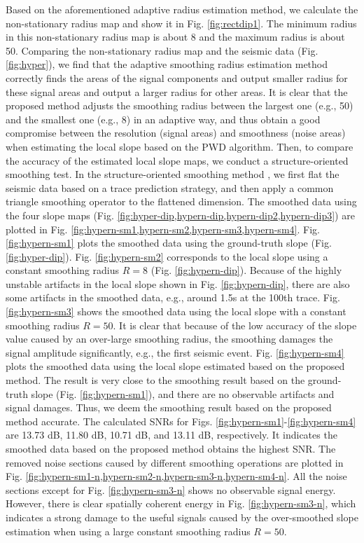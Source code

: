 Based on the aforementioned adaptive radius estimation method, we calculate the non-stationary radius map and show it in Fig. \ref{fig:rectdip1}. The minimum radius in this non-stationary radius map is about 8 and the maximum radius is about 50. Comparing the non-stationary radius map and the seismic data (Fig. \ref{fig:hyper}), we find that the adaptive smoothing radius estimation method correctly finds the areas of the signal components and output smaller radius for these signal areas and output a larger radius for other areas. It is clear that the proposed method adjusts the smoothing radius between the largest one (e.g., 50) and the smallest one (e.g., 8) in an adaptive way, and thus obtain a good compromise between the resolution (signal areas) and smoothness (noise areas) when estimating the local slope based on the PWD algorithm. Then, to compare the accuracy of the estimated local slope maps, we conduct a structure-oriented smoothing test. In the structure-oriented smoothing method \cite{sosvmf}, we first flat the seismic data based on a trace prediction strategy, and then apply a common triangle smoothing operator to the flattened dimension. 
The smoothed data using the four slope maps (Fig. \ref{fig:hyper-dip,hypern-dip,hypern-dip2,hypern-dip3}) are plotted in Fig. \ref{fig:hypern-sm1,hypern-sm2,hypern-sm3,hypern-sm4}. Fig. \ref{fig:hypern-sm1} plots the smoothed data using the ground-truth slope (Fig. \ref{fig:hyper-dip}). Fig. \ref{fig:hypern-sm2} corresponds to the local slope using a constant smoothing radius $R=8$ (Fig. \ref{fig:hypern-dip}). Because of the highly unstable artifacts in the local slope shown in Fig. \ref{fig:hypern-dip}, there are also some artifacts in the smoothed data, e.g., around 1.5s at the 100th trace.  Fig. \ref{fig:hypern-sm3} shows the smoothed data using the local slope with a constant smoothing radius $R=50$. It is clear that because of the low accuracy of the slope value caused by an over-large smoothing radius, the smoothing damages the signal amplitude significantly, e.g., the first seismic event. Fig.  \ref{fig:hypern-sm4} plots the smoothed data using the local slope estimated based on the proposed method. The result is very close to the smoothing result based on the ground-truth slope (Fig. \ref{fig:hypern-sm1}), and there are no observable artifacts and signal damages. Thus, we deem the smoothing result based on the proposed method accurate. The calculated SNRs for Figs. \ref{fig:hypern-sm1}-\ref{fig:hypern-sm4} are 13.73 dB, 11.80 dB, 10.71 dB, and 13.11 dB, respectively. It indicates  the smoothed data based on the proposed method obtains the highest SNR.  The removed noise sections caused by different smoothing operations are plotted in Fig. \ref{fig:hypern-sm1-n,hypern-sm2-n,hypern-sm3-n,hypern-sm4-n}. All the noise sections except for Fig. \ref{fig:hypern-sm3-n} shows no observable signal energy. However, there is  clear spatially coherent energy in Fig. \ref{fig:hypern-sm3-n}, which indicates a strong damage to the useful signals caused by the over-smoothed slope estimation when using a large constant smoothing radius $R=50$.

